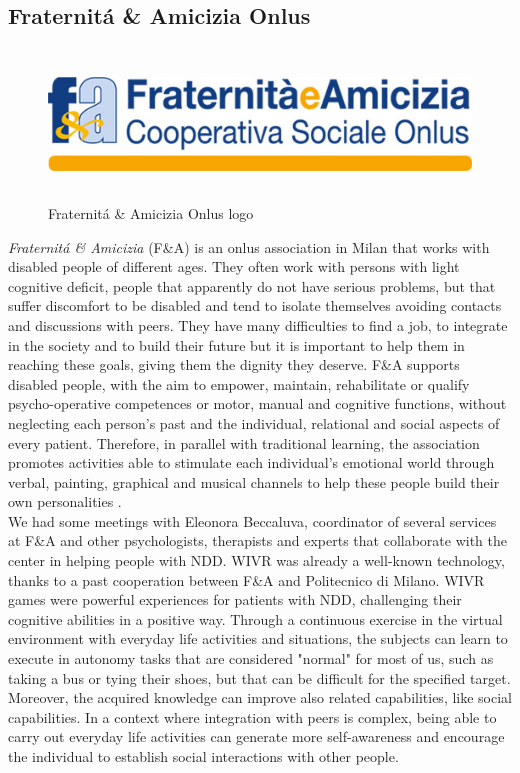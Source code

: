 \subsection{Fraternit\'a \& Amicizia Onlus}
\begin{figure}[H]
\centering
\includegraphics[width=12cm, height=4cm]{immagini/logofa.jpg}
\caption{Fraternit\'a \& Amicizia Onlus logo}\label{fig:logofa}
\end{figure}
\textit{Fraternit\'a \& Amicizia} (F\&A) is an onlus association in Milan that works with disabled people of different ages. They often work with persons with light cognitive deficit, people that apparently do not have serious problems, but that suffer discomfort to be disabled and tend to isolate themselves avoiding contacts and discussions with peers. They have many difficulties to find a job, to integrate in the society and to build their future but it is important to help them in reaching these goals, giving them the dignity they deserve. F\&A supports disabled people, with the aim to empower, maintain, rehabilitate or qualify psycho-operative competences or motor, manual and cognitive functions, without neglecting each person's past and the individual, relational and social aspects of every patient. Therefore, in parallel with traditional learning, the association promotes activities able to stimulate each individual's emotional world through verbal, painting, graphical and musical channels to help these people build their own personalities \cite{Amicizia}.\\
We had some meetings with Eleonora Beccaluva, coordinator of several services at F\&A and other psychologists, therapists and experts that collaborate with the center in helping people with NDD. WIVR
was already a well-known technology, thanks to a past cooperation between F\&A and Politecnico di Milano. WIVR games were powerful experiences for patients with NDD, challenging their cognitive abilities in a positive way. Through a continuous exercise in the virtual environment with everyday life activities and situations, the subjects can learn to execute in autonomy tasks that are considered "normal" for most of us, such as taking a bus or tying their shoes, but that can be difficult for the specified target. Moreover, the acquired knowledge can improve also related capabilities, like social capabilities. In a context where integration with peers is complex, being able to carry out everyday life activities can generate more self-awareness and encourage the individual to establish social interactions with other people.


